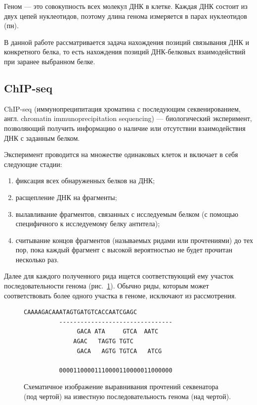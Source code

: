 \documentclass{matmex-diploma-custom}
\begin{document}
Геном --- это совокупность всех молекул ДНК в клетке.
Каждая ДНК состоит из двух цепей нуклеотидов, поэтому длина генома измеряется в парах нуклеотидов (пн).

В данной работе рассматривается задача нахождения позиций связывания ДНК и конкретного белка, то есть нахождения позиций ДНК-белковых взаимодействий при заранее выбранном белке. 

\subsection*{ChIP-seq}
ChIP-seq (иммунопреципитация хроматина с последующим секвенированием, англ. chromatin immunoprecipitation sequencing) --- биологический эксперимент, позволяющий получить информацию о наличие или отсутствии
взаимодействия ДНК с заданным белком.

Эксперимент проводится на множестве одинаковых клеток и включает в себя следующие стадии:
\begin{enumerate}
\item фиксация всех обнаруженных белков на ДНК;
\item расщепление ДНК на фрагменты;
\item вылавливание фрагментов, связанных с исследуемым белком (с помощью специфичного к исследуемому белку антитела);
\item считывание концов фрагментов (называемых ридами или прочтениями) до тех пор, пока каждый фрагмент с высокой вероятностью не будет прочитан несколько раз.
\end{enumerate} 

Далее для каждого полученного рида ищется соответствующий
ему участок последовательности генома (рис.~\ref{fig:chip-seq}). Обычно
риды, которым может соответствовать более одного участка в геноме,
исключают из рассмотрения.

\begin{figure}[h]
  \centering

\begin{Verbatim}[commandchars=\\\{\}]
          CAAAAGACAAATAGTGATGTCACCAATCGAGC
          --------------------------------
               GACA ATA     GTCA  AATC
              AGAC   TAGTG TGTC
               GACA   AGTG TGTCA   ATCG

          00001100001110000110000011000000
\end{Verbatim}
  \caption{Схематичное изображение выравнивания прочтений секвенатора (под чертой)
    на известную последовательность генома (над чертой).}
  \label{fig:chip-seq}
\end{figure}
\end{document}
